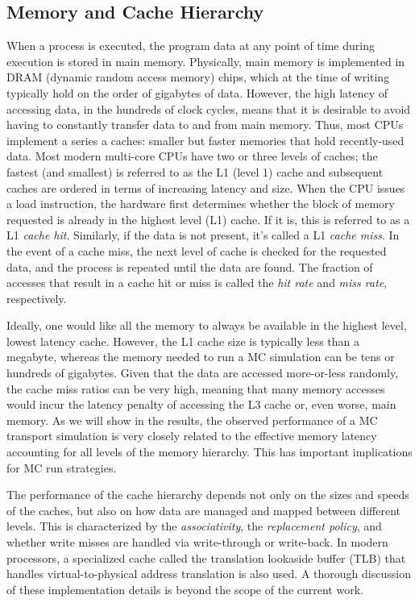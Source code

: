 \documentclass{mc2015}
\begin{document}
\subsection{Memory and Cache Hierarchy}

When a process is executed, the program data at any point of time during
execution is stored in main memory. Physically, main memory is implemented in
DRAM (dynamic random access memory) chips, which at the time of writing
typically hold on the order of gigabytes of data. However, the high latency of
accessing data, in the hundreds of clock cycles, means that it is desirable to
avoid having to constantly transfer data to and from main memory. Thus, most
CPUs implement a series a caches: smaller but faster memories that hold
recently-used data. Most modern multi-core CPUs have two or three levels of
caches; the fastest (and smallest) is referred to as the L1 (level 1) cache and
subsequent caches are ordered in terms of increasing latency and size. When the
CPU issues a load instruction, the hardware first determines whether the block
of memory requested is already in the highest level (L1) cache. If it is, this
is referred to as a L1 \emph{cache hit}. Similarly, if the data is not present,
it's called a L1 \emph{cache miss}. In the event of a cache miss, the next
level of cache is checked for the requested data, and the process is repeated
until the data are found. The fraction of accesses that result in a cache hit
or miss is called the \emph{hit rate} and \emph{miss rate}, respectively.

Ideally, one would like all the memory to always be available in the highest
level, lowest latency cache. However, the L1 cache size is typically less than
a megabyte, whereas the memory needed to run a MC simulation can be tens or
hundreds of gigabytes. Given that the data are accessed more-or-less randomly,
the cache miss ratios can be very high, meaning that many memory accesses would
incur the latency penalty of accessing the L3 cache or, even worse, main
memory. As we will show in the results, the observed performance of a MC
transport simulation is very closely related to the effective memory latency
accounting for all levels of the memory hierarchy. This has important
implications for MC run strategies.

The performance of the cache hierarchy depends not only on the sizes and speeds
of the caches, but also on how data are managed and mapped between different
levels. This is characterized by the \emph{associativity}, the
\emph{replacement policy}, and whether write misses are handled via
write-through or write-back. In modern processors, a specialized cache called
the translation lookaside buffer (TLB) that handles virtual-to-physical address
translation is also used. A thorough discussion of these implementation details
is beyond the scope of the current work.
\end{document}
